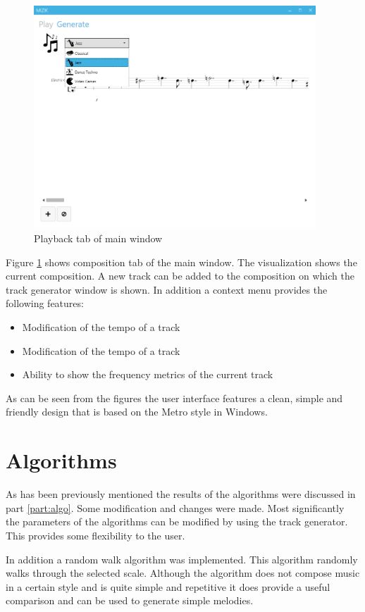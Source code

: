 \begin{figure}
\centerline{\includegraphics[width=400px]{../images/res_ui_generate_tab.png}}
\caption{Playback tab of main window}
\label{ims:res_ui_generate}
\end{figure}

Figure \ref{ims:res_ui_generate} shows composition tab of the main window. The visualization shows the current composition. A new track can be added to the composition on which the track generator window is shown. 
In addition a context menu provides the following features:
\begin{itemize}
\item Modification of the tempo of a track
\item Modification of the tempo of a track
\item Ability to show the frequency metrics of the current track
\end{itemize}

As can be seen from the figures the user interface features a clean, simple and friendly design that is based on the Metro style in Windows.


\section{Algorithms}
As has been previously mentioned the results of the algorithms were discussed in part \ref{part:algo}.
Some modification and changes were made. Most significantly the parameters of the algorithms can be modified by using the track generator. This provides some flexibility to the user.

In addition a random walk algorithm was implemented. This algorithm randomly walks through the selected scale. Although the algorithm does not compose music in a certain style and is quite simple and repetitive it does provide a useful comparison and can be used to generate simple melodies.

